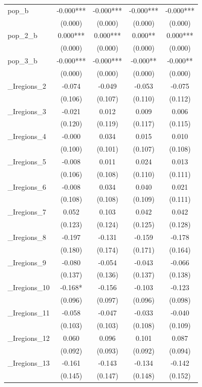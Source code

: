 \documentclass[]{article}
\begin{document}
\begin{tabular}{lcccc}
pop\_b & -0.000*** & -0.000*** & -0.000*** & -0.000*** \\
 & (0.000) & (0.000) & (0.000) & (0.000) \\
pop\_2\_b & 0.000*** & 0.000*** & 0.000** & 0.000*** \\
 & (0.000) & (0.000) & (0.000) & (0.000) \\
pop\_3\_b & -0.000*** & -0.000*** & -0.000** & -0.000** \\
 & (0.000) & (0.000) & (0.000) & (0.000) \\
\_Iregions\_2 & -0.074 & -0.049 & -0.053 & -0.075 \\
 & (0.106) & (0.107) & (0.110) & (0.112) \\
\_Iregions\_3 & -0.021 & 0.012 & 0.009 & 0.006 \\
 & (0.120) & (0.119) & (0.117) & (0.115) \\
\_Iregions\_4 & -0.000 & 0.034 & 0.015 & 0.010 \\
 & (0.100) & (0.101) & (0.107) & (0.108) \\
\_Iregions\_5 & -0.008 & 0.011 & 0.024 & 0.013 \\
 & (0.106) & (0.108) & (0.110) & (0.111) \\
\_Iregions\_6 & -0.008 & 0.034 & 0.040 & 0.021 \\
 & (0.108) & (0.108) & (0.109) & (0.111) \\
\_Iregions\_7 & 0.052 & 0.103 & 0.042 & 0.042 \\
 & (0.123) & (0.124) & (0.125) & (0.128) \\
\_Iregions\_8 & -0.197 & -0.131 & -0.159 & -0.178 \\
 & (0.180) & (0.174) & (0.171) & (0.164) \\
\_Iregions\_9 & -0.080 & -0.054 & -0.043 & -0.066 \\
 & (0.137) & (0.136) & (0.137) & (0.138) \\
\_Iregions\_10 & -0.168* & -0.156 & -0.103 & -0.123 \\
 & (0.096) & (0.097) & (0.096) & (0.098) \\
\_Iregions\_11 & -0.058 & -0.047 & -0.033 & -0.040 \\
 & (0.103) & (0.103) & (0.108) & (0.109) \\
\_Iregions\_12 & 0.060 & 0.096 & 0.101 & 0.087 \\
 & (0.092) & (0.093) & (0.092) & (0.094) \\
\_Iregions\_13 & -0.161 & -0.143 & -0.134 & -0.142 \\
 & (0.145) & (0.147) & (0.148) & (0.152) \\

\end{tabular}
\end{document}
